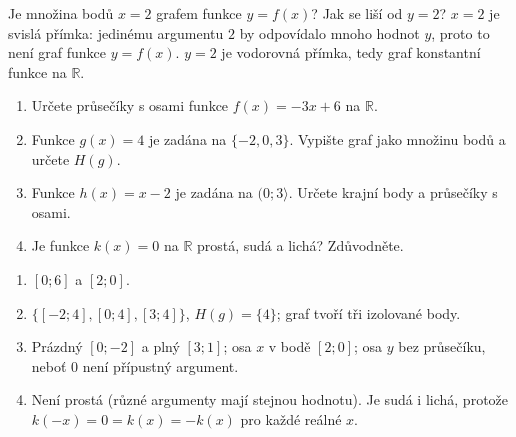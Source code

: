\documentclass[11pt,a4paper]{article}
\begin{document}
\begin{zadaniReseniBox}[title={Rozšíření 1}]
Je množina bodů $x=2$ grafem funkce $y=f(x)$? Jak se liší od $y=2$?
\tcblower
$x=2$ je svislá přímka: jedinému argumentu $2$ by odpovídalo mnoho hodnot $y$,
proto to není graf funkce $y=f(x)$. $y=2$ je vodorovná přímka, tedy graf
konstantní funkce na $\mathbb R$.
\end{zadaniReseniBox}

\begin{zadaniReseniBox}[title={Domácí úkol}]
\begin{enumerate}[label=\alph*)]
\item Určete průsečíky s osami funkce $f(x)=-3x+6$ na $\mathbb R$.
\item Funkce $g(x)=4$ je zadána na $\{-2,0,3\}$. Vypište graf jako množinu bodů a určete $H(g)$.
\item Funkce $h(x)=x-2$ je zadána na $(0;3\rangle$. Určete krajní body a průsečíky s osami.
\item Je funkce $k(x)=0$ na $\mathbb R$ prostá, sudá a lichá? Zdůvodněte.
\end{enumerate}
\tcblower
\begin{enumerate}[label=\alph*)]
\item $[0;6]$ a $[2;0]$.
\item $\{[-2;4],[0;4],[3;4]\}$, $H(g)=\{4\}$; graf tvoří tři izolované body.
\item Prázdný $[0;-2]$ a plný $[3;1]$; osa $x$ v bodě $[2;0]$;
osa $y$ bez průsečíku, neboť $0$ není přípustný argument.
\item Není prostá (různé argumenty mají stejnou hodnotu). Je sudá i lichá,
protože $k(-x)=0=k(x)=-k(x)$ pro každé reálné $x$.
\end{enumerate}
\end{zadaniReseniBox}
\end{document}
